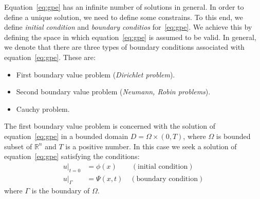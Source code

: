 \begin{frame}[t]{\subsecname}
Equation~\eqref{eq:gpe} has an infinite number of solutions in general. In order to define a unique solution, we need to define some constrains. To this end, we define \emph{initial condition} and \emph{boundary conditios} for~\eqref{eq:gpe}. We achieve this by defining the space in which equation~\eqref{eq:gpe} is assumed to be valid. In general, we denote that there are three types of boundary conditions associated with equation~\eqref{eq:gpe}. These are:
\begin{itemize}
	\item First boundary value problem (\emph{Dirichlet problem}).
	\item Second boundary value problem (\emph{Neumann, Robin problems}).
	\item Cauchy problem.
\end{itemize}
The first boundary value problem is concerned with the solution of equation~\eqref{eq:gpe} in a bounded domain $D=\Omega\times\left(0,T\right)$, where $\Omega$ is bounded subset of $\mathbb{R}^{n}$ and $T$ is a positive number. In this case we seek a solution of equation~\eqref{eq:gpe} satisfying the conditions:
\begin{equation}\label{eq:bc}
\begin{split}
{\left.u\right\vert}_{t=0}&=\phi\left(x\right)\qquad\left(\text{initial condition}\right)\\
{\left.u\right\vert}_{\Gamma}&=\Psi\left(x,t\right)\quad\left(\text{boundary condition}\right)
\end{split}
\end{equation}
where $\Gamma$ is the boundary of $\Omega$.
\end{frame}

